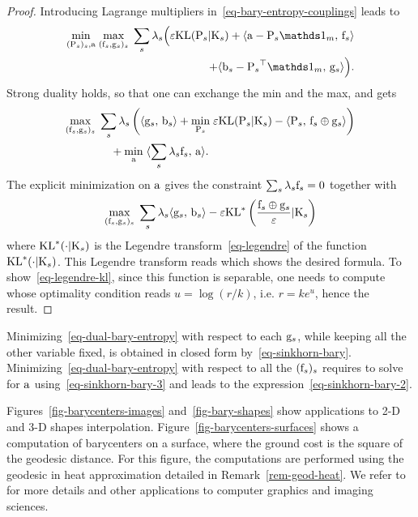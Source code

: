 \begin{proof}
	Introducing Lagrange multipliers in~\eqref{eq-bary-entropy-couplings} leads to
	\begin{align*}
		\umin{ (\P_s)_s, \a } 
		\umax{ ( \fD_s,\gD_s )_s }
		\sum_{s} \la_s \Big(
			\epsilon \KLD( \P_s|\K_s )
			+ 
			\dotp{\a - \P_s\ones_m}{ \fD_s } \\
		\qquad\qquad	+			
			\dotp{\b_s - \transp{\P_s}\ones_m}{ \gD_s }
		\Big).
	\end{align*}
	Strong duality holds, so that one can exchange the min and the max, and gets
		\begin{align*}
		&\underset{ ( \mathrm{f}_s,\mathrm{g}_s )_s }{\max}\;
			\sum_s \lambda_s \left( 
				 \langle \mathrm{g}_s,\,\mathrm{b}_s\rangle
		+ 
		\underset{\mathrm{P}_s}{\min}\; \varepsilon \mathrm{KL}( \mathrm{P}_s|\mathrm{K}_s ) - \langle \mathrm{P}_s,\,\mathrm{f}_s \oplus \mathrm{g}_s \rangle
		 \right) \\
	&\qquad\qquad	+ \underset{\mathrm{a}}{\min}\;
			\langle  \sum_{s} \lambda_s \mathrm{f}_s ,\,\mathrm{a}\rangle.
	\end{align*}
	The explicit minimization on $\mathrm{a}$ gives the constraint $\sum_{s} \lambda_s \mathrm{f}_s=0$ together with 
	\begin{align*}
		\underset{ ( \mathrm{f}_s,\mathrm{g}_s )_s }{\max}\;
			\sum_s \lambda_s 
				 \langle \mathrm{g}_s,\,\mathrm{b}_s\rangle
		-
		\varepsilon \mathrm{KL}^*\left(  \frac{\mathrm{f}_s \oplus \mathrm{g}_s}{\varepsilon}|\mathrm{K}_s  \right)
	\end{align*}
	where $\mathrm{KL}^*(\cdot|\mathrm{K}_s)$ is the Legendre transform~\eqref{eq-legendre} of the function $\mathrm{KL}^*(\cdot|\mathrm{K}_s)$.
	This Legendre transform reads
	which shows the desired formula. 
	To show~\eqref{eq-legendre-kl}, since this function is separable, one needs to compute
	whose optimality condition reads $u=\log(r/k)$, i.e. $r = k e^{u}$, hence the result.
\end{proof}

Minimizing~\eqref{eq-dual-bary-entropy} with respect to each $\mathrm{g}_s$, while keeping all the other variable fixed, is obtained in closed form by~\eqref{eq-sinkhorn-bary}. 
%
Minimizing~\eqref{eq-dual-bary-entropy} with respect to all the $(\mathrm{f}_s)_s$ requires to solve for $\mathrm{a}$ using~\eqref{eq-sinkhorn-bary-3} and leads to the expression~\eqref{eq-sinkhorn-bary-2}.

Figures~\ref{fig-barycenters-images} and~\ref{fig-bary-shapes} show applications to 2-D and 3-D shapes interpolation. Figure~\ref{fig-barycenters-surfaces} shows a computation of barycenters on a surface, where the ground cost is the square of the geodesic distance. For this figure, the computations are performed using the geodesic in heat approximation detailed in Remark~\ref{rem-geod-heat}. We refer to~\cite{2015-solomon-siggraph} for more details and other applications to computer graphics and imaging sciences.




